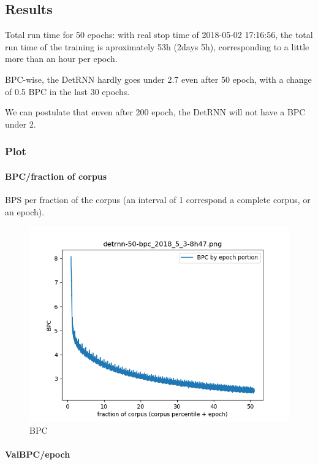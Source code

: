 \newpage
\subsection{Results}

Total run time for 50 epochs: with real stop time of 2018-05-02
17:16:56, the total run time of the training is aproximately 53h (2days
5h), corresponding to a little more than an hour per epoch.

BPC-wise, the DetRNN hardly goes under 2.7 even after 50 epoch, with a
change of 0.5 BPC in the last 30 epochs.

We can postulate that enven after 200 epoch, the DetRNN will not have a
BPC under 2.

\subsubsection{Plot}

\paragraph{BPC/fraction of corpus}

BPS per fraction of the corpus (an interval of 1 correspond a complete
corpus, or an epoch).

\begin{figure}[ht]
\centering
\includegraphics{parts/appendix/reports-gmsnn/docs_esteban-latex/test_reports/detrnn-50/detrnn-50-bpc_2018_5_3-8h47.png}
\caption{BPC}
\end{figure}

\newpage
\paragraph{ValBPC/epoch}


